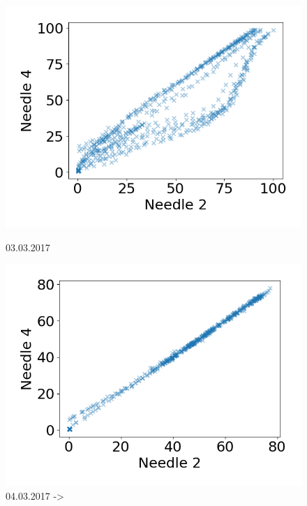 \begin{figure}[h]
\begin{minipage}[b]{0.5\linewidth}
                \includegraphics[width = \textwidth]{report/figures/data/turb2_n2_n4_03032017.png}
                \caption{03.03.2017}
                \label{fig:n_pos_0303}
            \end{minipage}
            \begin{minipage}[b]{0.5\linewidth}
                \centering
                \includegraphics[width = \textwidth]{report/figures/data/turb2_n2_n4_after_04032017.png}
                \caption{04.03.2017 ->}
                \label{fig:n_pos_aft_0303}
            \end{minipage}
        \end{figure}
        
